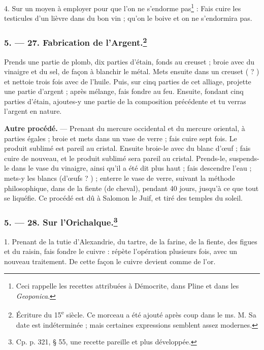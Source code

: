 \documentclass[a4paper, 11pt, oneside, polutonikogreek, french]{article}
\begin{document}
4. Sur un moyen à employer pour que l'on ne s'endorme pas\footnote{Ceci rappelle les recettes attribuées à Démocrite, dans Pline et dans les \emph{Geoponica}.} : Fais cuire les testicules d'un lièvre dans du bon vin ; qu'on le boive et on ne s'endormira pas.

\bigskip
\centerline{\EightStarTaper}
\centerline{\EightStarTaper\EightStarTaper}
\bigskip

\subsubsection[5. --- 27. Fabrication de l'Argent.]{5. --- 27. Fabrication de l'Argent.\footnote{Écriture du 15\textsuperscript{e} siècle. Ce morceau a été ajouté après coup dans le ms. M. Sa date est indéterminée ; mais certaines expressions semblent assez modernes.}}

Prends une partie de plomb, dix parties d'étain, fonds au creuset ; broie avec du vinaigre et du sel, de façon à blanchir le métal. Mets ensuite dans un creuset ( ? ) et nettoie trois fois avec de l'huile. Puis, sur cinq parties de cet alliage, projette une partie d'argent ; après mélange, fais fondre au feu. Ensuite, fondant cinq parties d'étain, ajoutes-y une partie de la composition précédente et tu verras l'argent en nature.

\textbf{Autre procédé.} --- Prenant du mercure occidental et du mercure oriental, à parties égales ; broie et mets dans un vase de verre ; fais cuire sept fois. Le produit sublimé est pareil au cristal. Ensuite broie-le avec du blanc d'œuf ; fais cuire de nouveau, et le produit sublimé sera pareil au cristal. Prends-le, suspends-le dans le vase du vinaigre, ainsi qu'il a été dit plus haut ; fais descendre l'eau ; mets-y les blancs (d'œufs ? ) ; enterre le vase de verre, suivant la méthode philosophique, dans de la fiente (de cheval), pendant 40 jours, jusqu'à ce que tout se liquéfie. Ce procédé est dû à Salomon le Juif, et tiré des temples du soleil.

\bigskip
\centerline{\EightStarTaper}
\centerline{\EightStarTaper\EightStarTaper}
\bigskip

\subsubsection[5. --- 28. Sur l'Orichalque.]{5. --- 28. Sur l'Orichalque.\footnote{Cp. p. 321, § 55, une recette pareille et plus développée.}}

1. Prenant de la tutie d'Alexandrie, du tartre, de la farine, de la fiente, des figues et du raisin, fais fondre le cuivre : répète l'opération plusieurs fois, avec un nouveau traitement. De cette façon le cuivre devient comme de l'or.
\end{document}
